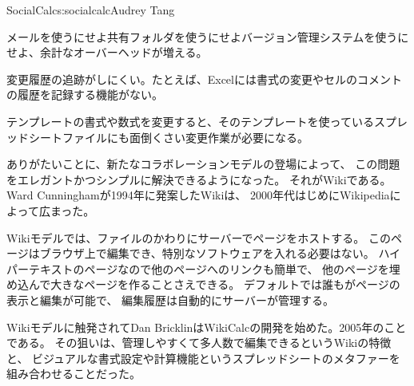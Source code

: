 \begin{aosachapter}{SocialCalc}{s:socialcalc}{Audrey Tang}
\begin{aosaitemize}
  \item メールを使うにせよ共有フォルダを使うにせよバージョン管理システムを使うにせよ、余計なオーバーヘッドが増える。

  \item 変更履歴の追跡がしにくい。たとえば、Excelには書式の変更やセルのコメントの履歴を記録する機能がない。

  \item テンプレートの書式や数式を変更すると、そのテンプレートを使っているスプレッドシートファイルにも面倒くさい変更作業が必要になる。

\end{aosaitemize}

ありがたいことに、新たなコラボレーションモデルの登場によって、
この問題をエレガントかつシンプルに解決できるようになった。
それがWikiである。Ward Cunninghamが1994年に発案したWikiは、
2000年代はじめにWikipediaによって広まった。

Wikiモデルでは、ファイルのかわりにサーバーでページをホストする。
このページはブラウザ上で編集でき、特別なソフトウェアを入れる必要はない。
ハイパーテキストのページなので他のページへのリンクも簡単で、
他のページを埋め込んで大きなページを作ることさえできる。
デフォルトでは誰もがページの表示と編集が可能で、
編集履歴は自動的にサーバーが管理する。

Wikiモデルに触発されてDan BricklinはWikiCalcの開発を始めた。2005年のことである。
その狙いは、管理しやすくて多人数で編集できるというWikiの特徴と、
ビジュアルな書式設定や計算機能というスプレッドシートのメタファーを組み合わせることだった。


\end{aosachapter}
